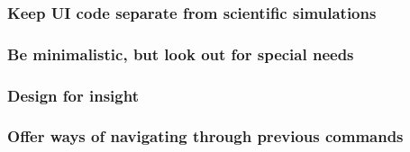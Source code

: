 \subsubsection{Keep UI code separate from scientific simulations}

\subsubsection{Be minimalistic, but look out for special needs}

\subsubsection{Design for insight}

\subsubsection{Offer ways of navigating through previous commands}

